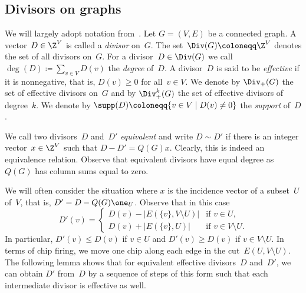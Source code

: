  
\subsection{Divisors on graphs}
We will largely adopt notation from~\cite{BakerNorine2007}. Let $G=(V,E)$ be a connected graph. A vector~$D\in \Z^V$ is called a \emph{divisor} on~$G$. The set~$\Div(G)\coloneqq \Z^V$ denotes the set of all divisors on~$G$. For a divisor~$D\in \Div(G)$ we call $\deg(D)\coloneqq \sum_{v\in V}D(v)$ the \emph{degree} of~$D$. A divisor~$D$ is said to be \emph{effective} if it is nonnegative, that is, $D(v)\geq 0$ for all~$v\in V$. We denote by $\Div_+(G)$ the set of effective divisors on~$G$ and by $\Div_+^k(G)$ the set of effective divisors of degree~$k$. We denote by $\supp(D)\coloneqq \{v\in V\mid D(v)\neq 0\}$ the \emph{support} of~$D$.

We call two divisors~$D$ and~$D'$ \emph{equivalent} and write $D\sim D'$ if there is an integer vector~$x\in \Z^V$ such that $D-D'=Q(G)x$. Clearly, this is indeed an equivalence relation. Observe that equivalent divisors have equal degree as $Q(G)$ has column sums equal to zero. 

We will often consider the situation where $x$ is the incidence vector of a subset~$U$ of~$V$, that is, $D'=D-Q(G)\one_U$. Observe that in this case 
\begin{equation}
D'(v)=\begin{cases}D(v)-|E(\{v\},V\setminus U)|&\text{if $v\in U$},\\D(v)+|E(\{v\},U)|&\text{if $v\in V\setminus U$.}\end{cases}
\end{equation}
In particular, $D'(v)\leq D(v)$ if $v\in U$ and $D'(v)\geq D(v)$ if $v\in V\setminus U$. In terms of chip firing, we move one chip along each edge in the cut~$E(U,V\setminus U)$. The following lemma shows that for equivalent effective divisors~$D$ and~$D'$, we can obtain $D'$ from~$D$ by a sequence of steps of this form such that each intermediate divisor is effective as well.

